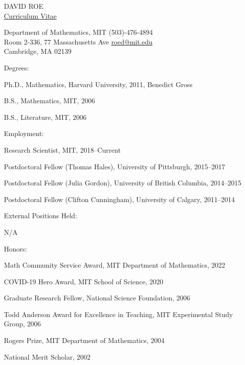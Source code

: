 \documentclass{article}
\newcommand{\email}[1]{\href{mailto:#1}{#1}}
\begin{document}
\begin{center}
DAVID ROE \\[0.2in]
\underline{Curriculum Vitae} \\[0.2in]

\end{center}

\noindent Department of Mathematics, MIT \hfill (503)-476-4894 \\
Room 2-336, 77 Massachusetts Ave \hfill \email{roed@mit.edu} \\
Cambridge, MA 02139

\vspace{0.4in}

\noindent Degrees:

Ph.D., Mathematics, Harvard University, 2011, Benedict Gross

B.S., Mathematics, MIT, 2006

B.S., Literature, MIT, 2006

\vspace{0.2in}
\noindent Employment:

Research Scientist, MIT, 2018--Current

Postdoctoral Fellow (Thomas Hales), University of Pittsburgh, 2015--2017

Postdoctoral Fellow (Julia Gordon), University of British Columbia, 2014--2015

Postdoctoral Fellow (Clifton Cunningham), University of Calgary, 2011--2014

\vspace{0.2in}
\noindent External Positions Held:

N/A

\vspace{0.2in}
\noindent Honors:

Math Community Service Award, MIT Department of Mathematics, 2022

COVID-19 Hero Award, MIT School of Science, 2020

Graduate Research Fellow, National Science Foundation, 2006



Todd Anderson Award for Excellence in Teaching, MIT Experimental Study Group, 2006

Rogers Prize, MIT Department of Mathematics, 2004

National Merit Scholar, 2002


\end{document}
